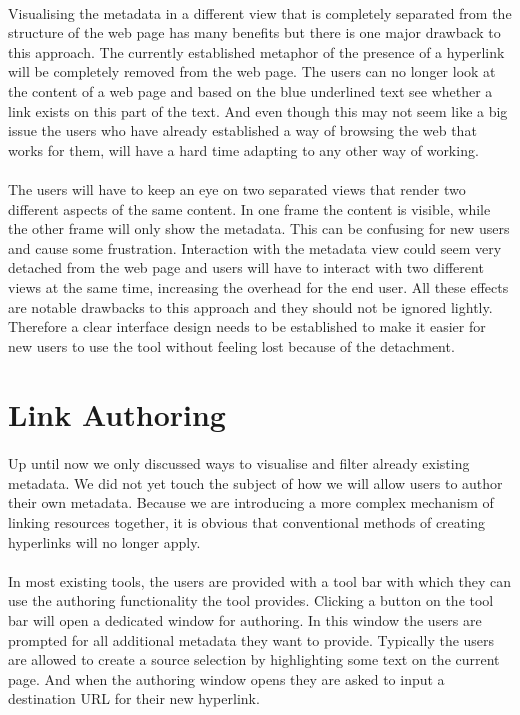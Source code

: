 	\paragraph{}
	Visualising the metadata in a different view that is completely separated from the structure of the web page has many benefits but there is one major drawback to this approach. The currently established metaphor of the presence of a hyperlink will be completely removed from the web page. The users can no longer look at the content of a web page and based on the blue underlined text see whether a link exists on this part of the text. And even though this may not seem like a big issue the users who have already established a way of browsing the web that works for them, will have a hard time adapting to any other way of working.
	\paragraph{}
	The users will have to keep an eye on two separated views that render two different aspects of the same content. In one frame the content is visible, while the other frame will only show the metadata. This can be confusing for new users and cause some frustration. Interaction with the metadata view could seem very detached from the web page and users will have to interact with two different views at the same time, increasing the overhead for the end user. All these effects are notable drawbacks to this approach and they should not be ignored lightly. Therefore a clear interface design needs to be established to make it easier for new users to use the tool without feeling lost because of the detachment.

\section{Link Authoring} \label{sec:Link Authoring}
\paragraph{}
Up until now we only discussed ways to visualise and filter already existing metadata. We did not yet touch the subject of how we will allow users to author their own metadata. Because we are introducing a more complex mechanism of linking resources together, it is obvious that conventional methods of creating hyperlinks will no longer apply.
\paragraph{}
In most existing tools, the users are provided with a tool bar with which they can use the authoring functionality the tool provides. Clicking a button on the tool bar will open a dedicated window for authoring. In this window the users are prompted for all additional metadata they want to provide. Typically the users are allowed to create a source selection by highlighting some text on the current page. And when the authoring window opens they are asked to input a destination URL for their new hyperlink.
